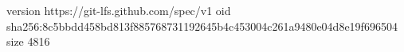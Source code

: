 version https://git-lfs.github.com/spec/v1
oid sha256:8c5bbdd458bd813f885768731192645b4c453004c261a9480e04d8e19f696504
size 4816
